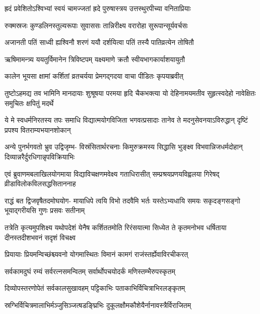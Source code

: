 \twolineshloka
{ह्रदं प्रवेशितोऽश्विभ्यां स्वयं चामज्जतां ह्रदे}
{पुरुषास्त्रय उत्तस्थुरपीच्या वनिताप्रियाः}%

\twolineshloka
{रुक्मस्रजः कुण्डलिनस्तुल्यरूपाः सुवाससः}
{तान्निरीक्ष्य वरारोहा सुरूपान्सूर्यवर्चसः}%

\twolineshloka
{अजानती पतिं साध्वी ह्यश्विनौ शरणं ययौ}
{दर्शयित्वा पतिं तस्यै पातिव्रत्येन तोषितौ}%

\twolineshloka
{ऋषिमामन्त्र्य ययतुर्विमानेन त्रिविष्टपम्}
{यक्ष्यमाणे क्रतौ स्वीयभागकार्याशयायुतौ}%

\twolineshloka
{कालेन भूयसा क्षामां कर्शितां व्रतचर्यया}
{प्रेमगद्गदया वाचा पीडितः कृपयाब्रवीत्}%

\fourlineindentedshloka
{तुष्टोऽहमद्य तव भामिनि मानदायाः}
{शुश्रूषया परमया हृदि चैकभक्त्या}
{यो देहिनामयमतीव सुहृत्स्वदेहो}
{नावेक्षितः समुचितः क्षपितुं मदर्थे}%

\fourlineindentedshloka
{ये मे स्वधर्मनिरतस्य तपः समाधि}
{विद्यात्मयोगविजिता भगवत्प्रसादाः}
{तानेव ते मदनुसेवनयाऽविरुद्धान्}
{दृष्टिं प्रपश्य वितराम्यभयानशोकान्}%

\fourlineindentedshloka
{अन्ये पुनर्भगवतो भ्रुव उद्विजृम्भ-}
{विस्रंसितार्थरचनाः किमुरुक्रमस्य}
{सिद्धासि भुङ्क्ष्व विभवान्निजधर्मदोहान्}
{दिव्यान्नरैर्दुरधिगान्नृपविक्रियाभिः}%

\fourlineindentedshloka
{एवं ब्रुवाणमबलाखिलयोगमाया}
{विद्याविचक्षणमवेक्ष्य गताधिरासीत्}
{सम्प्रश्रयप्रणयविह्वलया गिरेषद्}
{व्रीडाविलोकविलसद्धसिताननाह}%


\fourlineindentedshloka
{राद्धं बत द्विजवृषैतदमोघयोग-}
{मायाधिपे त्वयि विभो तदवैमि भर्तः}
{यस्तेऽभ्यधायि समयः सकृदङ्गसङ्गो}
{भूयाद्गरीयसि गुणः प्रसवः सतीनाम्}%

\fourlineindentedshloka
{तत्रेति कृत्यमुपशिक्ष्य यथोपदेशं}
{येनैष कर्शिततमोति रिरंसयात्मा}
{सिध्येत ते कृतमनोभव धर्षिताया}
{दीनस्तदीशभवनं सदृशं विचक्ष्व}%


\twolineshloka
{प्रियायाः प्रियमन्विच्छंश्च्यवनो योगमास्थितः}
{विमानं कामगं राजंस्तर्ह्येवाविरचीकरत्}%

\twolineshloka
{सर्वकामदुघं रम्यं सर्वरत्नसमन्वितम्}
{सर्वार्थोपचयोदर्कं मणिस्तम्भैरुपस्कृतम्}%

\twolineshloka
{दिव्योपस्तरणोपेतं सर्वकालसुखावहम्}
{पट्टिकाभिः पताकाभिर्विचित्राभिरलङ्कृतम्}%

\twolineshloka
{स्रग्भिर्विचित्रमालाभिर्मञ्जुसिञ्जत्षडङ्घ्रिभिः}
{दुकूलक्षौमकौशेयैर्नानावस्त्रैर्विराजितम्}%

